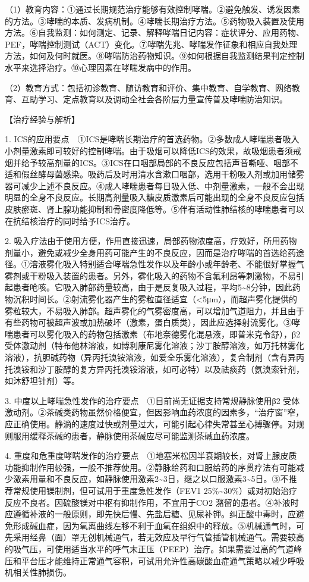 （1）教育内容：①通过长期规范治疗能够有效控制哮喘。②避免触发、诱发因素的方法。③哮喘的本质、发病机制。④哮喘长期治疗方法。⑤药物吸入装置及使用方法。⑥自我监测：如何测定、记录、解释哮喘日记内容：症状评分、应用药物、PEF，哮喘控制测试（ACT）变化。⑦哮喘先兆、哮喘发作征象和相应自我处理方法，如何及何时就医。⑧哮喘防治药物知识。⑨如何根据自我监测结果判定控制水平来选择治疗。⑩心理因素在哮喘发病中的作用。

（2）教育方式：包括初诊教育、随访教育和评价、集中教育、自学教育、网络教育、互助学习、定点教育以及调动全社会各阶层力量宣传普及哮喘防治知识。

【治疗经验与解析】

1.
ICS的应用要点　①ICS是哮喘长期治疗的首选药物。②多数成人哮喘患者吸入小剂量激素即可较好的控制哮喘。由于吸烟可以降低ICS的效果，故吸烟患者须戒烟并给予较高剂量的ICS。③ICS在口咽部局部的不良反应包括声音嘶哑、咽部不适和假丝酵母菌感染。吸药后及时用清水含漱口咽部，选用干粉吸入剂或加用储雾器可减少上述不良反应。④成人哮喘患者每日吸入低、中剂量激素，一般不会出现明显的全身不良反应。长期高剂量吸入糖皮质激素后可能出现的全身不良反应包括皮肤瘀斑、肾上腺功能抑制和骨密度降低等。⑤伴有活动性肺结核的哮喘患者可以在抗结核治疗的同时给予ICS治疗。

2.
吸入疗法由于使用方便，作用直接迅速，局部药物浓度高，疗效好，所用药物剂量小，避免或减少全身用药可能产生的不良反应，因而是治疗哮喘的首选给药途径。①溶液雾化吸入特别适合哮喘急性发作以及年龄小或年龄老、不能很好掌握气雾剂或干粉吸入装置的患者。另外，雾化吸入的药物不含氟利昂等刺激物，不易引起患者呛咳。它吸入肺部药量较高，由于是反复吸入过程，平均5\textasciitilde{}8分钟，因此药物沉积时间长。②射流雾化器产生的雾粒直径适宜（\textless{}5μm），而超声雾化提供的雾粒较大，不易吸入肺部。超声雾化的气雾密度高，可以增加气道阻力，并且由于有些药物可被超声波或加热破坏（激素，蛋白质类），因此应选择射流雾化。③哮喘患者可以雾化吸入的药物包括激素（布地奈德雾化混悬液，即普米克令舒），β{2}
受体激动剂（特布他林溶液，如博利康尼雾化溶液；沙丁胺醇溶液，如万托林雾化溶液），抗胆碱药物（异丙托溴铵溶液，如爱全乐雾化溶液），复合制剂（含有异丙托溴铵和沙丁胺醇的复方异丙托溴铵溶液，如可必特）以及祛痰药（氨溴索针剂，如沐舒坦针剂）等。

3. 中度以上哮喘急性发作的治疗要点　①目前尚无证据支持常规静脉使用β{2}
受体激动剂。②茶碱类药物虽然价格便宜，但因影响血药浓度的因素多，“治疗窗”窄，应正确使用。静滴的速度过快或剂量过大，可能引起心律失常甚至心搏骤停。对规则服用缓释茶碱的患者，静脉使用茶碱应尽可能监测茶碱血药浓度。

4.
重度和危重度哮喘发作的治疗要点　①地塞米松因半衰期较长，对肾上腺皮质功能抑制作用较强，一般不推荐使用。②静脉给药和口服给药的序贯疗法有可能减少激素用量和不良反应，如静脉使用激素2\textasciitilde{}3日，继之以口服激素3\textasciitilde{}5日。③不推荐常规使用镁制剂，但可试用于重度急性发作（FEV{1}
25\%\textasciitilde{}30\%）或对初始治疗反应不良者。因硫酸镁对中枢有抑制作用，不宜用于CO{2}
潴留的患者。④补液时应遵循补液的一般原则，即先快后慢、先盐后糖、见尿补钾。纠正酸中毒时，应避免形成碱血症，因为氧离曲线左移不利于血氧在组织中的释放。⑤机械通气时，可先采用经鼻（面）罩无创机械通气，若无效应及早行气管插管机械通气。需要较高的吸气压，可使用适当水平的呼气末正压（PEEP）治疗。如果需要过高的气道峰压和平台压才能维持正常通气容积，可试用允许性高碳酸血症通气策略以减少呼吸机相关性肺损伤。


